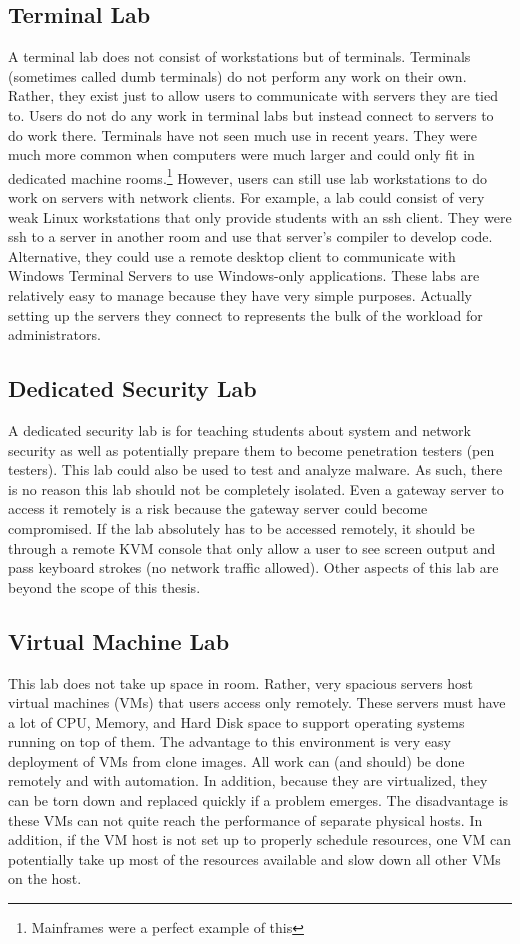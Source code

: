 \subsection{Terminal Lab}
A terminal lab does not consist of workstations but of terminals.  Terminals (sometimes called dumb terminals) do not perform any work on their own.   Rather, they exist just to allow users to communicate with servers they are tied to.  Users do not do any work in terminal labs but instead connect to servers to do work there.  Terminals have not seen much use in recent years.  They were much more common when computers were much larger and could only fit in dedicated machine rooms.\footnote{Mainframes were a perfect example of this}  However, users can still use lab workstations to do work on servers with network clients.  For example, a lab could consist of very weak Linux workstations that only provide students with an ssh client.  They were ssh to a server in another room and use that server's compiler to develop code.  Alternative, they could use a remote desktop client to communicate with Windows Terminal Servers to use Windows-only applications.  These labs are relatively easy to manage because they have very simple purposes.  Actually setting up the servers they connect to represents the bulk of the workload for administrators.  
\subsection{Dedicated Security Lab}
A dedicated security lab is for teaching students about system and network security as well as potentially prepare them to become penetration testers (pen testers).  This lab could also be used to test and analyze malware.  As such, there is no reason this lab should not be completely isolated.  Even a gateway server to access it remotely is a risk because the gateway server could become compromised.  If the lab absolutely has to be accessed remotely, it should be through a remote KVM console that only allow a user to see screen output and pass keyboard strokes (no network traffic allowed).  Other aspects of this lab are beyond the scope of this thesis.  
\subsection{Virtual Machine Lab}
This lab does not take up space in room.  Rather, very spacious servers host virtual machines (VMs) that users access only remotely.  These servers must have a lot of CPU, Memory, and Hard Disk space to support operating systems running on top of them.  The advantage to this environment is very easy deployment of VMs from clone images.  All work can (and should) be done remotely and with automation.  In addition, because they are virtualized, they can be torn down and replaced quickly if a problem emerges.  The disadvantage is these VMs can not quite reach the performance of separate physical hosts.  In addition, if the VM host is not set up to properly schedule resources, one VM can potentially take up most of the resources available and slow down all other VMs on the host.  

